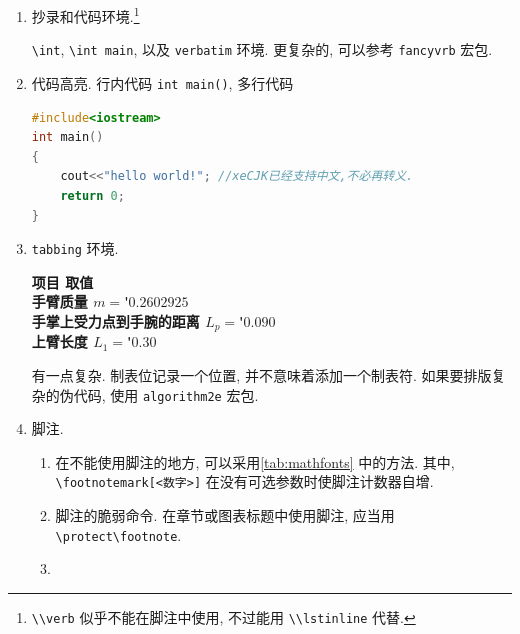 \documentclass[UTF8,no-math]{ctexart}
\numberwithin{enumi}{section}
\begin{document}
    \begin{enumerate}\setcounter{enumi}{\value{tmp}}
        \item 抄录和代码环境.\footnote{\lstinline|\\verb| 似乎不能在脚注中使用, 不过能用 \lstinline|\\lstinline| 代替.} \par \verb"\int", \verb*|\int main|, 以及 \verb!verbatim! 环境. 更复杂的, 可以参考 \verb|fancyvrb| 宏包.
        \item 代码高亮. 行内代码 \lstinline|int main()|, 多行代码
        \begin{lstlisting}[language=C]
#include<iostream>
int main()
{
    cout<<"hello world!"; //xeCJK已经支持中文,不必再转义.
    return 0;
}
        \end{lstlisting}
        \item \verb|tabbing| 环境.
        {\itshape\begin{tabbing}
            \bfseries 项目 \phantom{手掌上受力点到手腕的距离} 取值\=\\
            手臂质量 \> $m=$\'$0.2602925$\\
            手掌上受力点到手腕的距离 \> $L_p=$\'$0.090$ \\
            上臂长度 \> $L_1=$\'$0.30$ 
        \end{tabbing}}\par 
        有一点复杂. 制表位记录一个位置, 并不意味着添加一个制表符. 如果要排版复杂的伪代码, 使用 \verb|algorithm2e| 宏包.
        \item 脚注.
        \begin{enumerate}
            \item 在不能使用脚注的地方, 可以采用\autoref{tab:mathfonts} 中的方法. 其中, \verb|\footnotemark[<数字>]| 在没有可选参数时使脚注计数器自增.
            \item 脚注的脆弱命令. 在章节或图表标题中使用脚注, 应当用 \verb|\protect\footnote|. 
            \item {}
\end{enumerate}
\end{enumerate}
\end{document}

